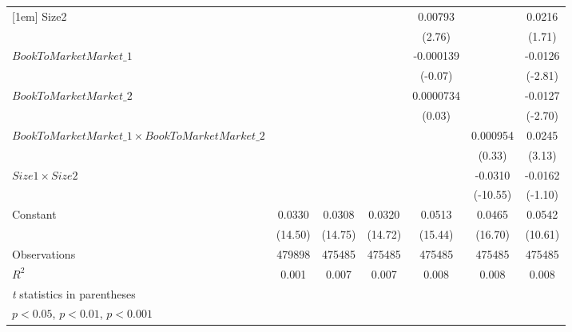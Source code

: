 {\begin{tabular}{l*{6}{c}}
[1em]
Size2               &                     &                     &                     &     0.00793\sym{**} &                     &      0.0216         \\
                    &                     &                     &                     &      (2.76)         &                     &      (1.71)         \\
[1em]
$ BookToMarketMarket\_1 $&                     &                     &                     &   -0.000139         &                     &     -0.0126\sym{**} \\
                    &                     &                     &                     &     (-0.07)         &                     &     (-2.81)         \\
[1em]
$ BookToMarketMarket\_2 $&                     &                     &                     &   0.0000734         &                     &     -0.0127\sym{**} \\
                    &                     &                     &                     &      (0.03)         &                     &     (-2.70)         \\
[1em]
$ BookToMarketMarket\_1 \times BookToMarketMarket\_2 $&                     &                     &                     &                     &    0.000954         &      0.0245\sym{**} \\
                    &                     &                     &                     &                     &      (0.33)         &      (3.13)         \\
[1em]
$ Size1 \times Size2 $&                     &                     &                     &                     &     -0.0310\sym{***}&     -0.0162         \\
                    &                     &                     &                     &                     &    (-10.55)         &     (-1.10)         \\
[1em]
Constant            &      0.0330\sym{***}&      0.0308\sym{***}&      0.0320\sym{***}&      0.0513\sym{***}&      0.0465\sym{***}&      0.0542\sym{***}\\
                    &     (14.50)         &     (14.75)         &     (14.72)         &     (15.44)         &     (16.70)         &     (10.61)         \\
\hline
Observations        &      479898         &      475485         &      475485         &      475485         &      475485         &      475485         \\
\(R^{2}\)           &       0.001         &       0.007         &       0.007         &       0.008         &       0.008         &       0.008         \\
\hline\hline
\multicolumn{7}{l}{\footnotesize \textit{t} statistics in parentheses}\\
\multicolumn{7}{l}{\footnotesize \sym{*} \(p<0.05\), \sym{**} \(p<0.01\), \sym{***} \(p<0.001\)}\\
\end{tabular}
}
